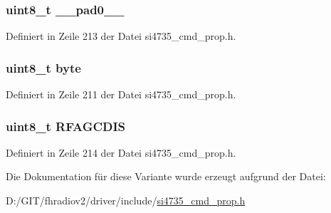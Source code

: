 \subsubsection[{\+\_\+\+\_\+pad0\+\_\+\+\_\+}]{\setlength{\rightskip}{0pt plus 5cm}uint8\+\_\+t \+\_\+\+\_\+pad0\+\_\+\+\_\+}\label{unionfm__agc__override__arg1_a8b4eebe79ded0459acec2f4950102ba3}


Definiert in Zeile 213 der Datei si4735\+\_\+cmd\+\_\+prop.\+h.

\hypertarget{unionfm__agc__override__arg1_a96f44d20f1dbf1c8785a7bc99a46164c}{}
\subsubsection[{byte}]{\setlength{\rightskip}{0pt plus 5cm}uint8\+\_\+t byte}\label{unionfm__agc__override__arg1_a96f44d20f1dbf1c8785a7bc99a46164c}


Definiert in Zeile 211 der Datei si4735\+\_\+cmd\+\_\+prop.\+h.

\hypertarget{unionfm__agc__override__arg1_a08f693cbe8c1321a038234eb53d365b9}{}
\subsubsection[{R\+F\+A\+G\+C\+D\+I\+S}]{\setlength{\rightskip}{0pt plus 5cm}uint8\+\_\+t R\+F\+A\+G\+C\+D\+I\+S}\label{unionfm__agc__override__arg1_a08f693cbe8c1321a038234eb53d365b9}


Definiert in Zeile 214 der Datei si4735\+\_\+cmd\+\_\+prop.\+h.



Die Dokumentation für diese Variante wurde erzeugt aufgrund der Datei\+:\begin{DoxyCompactItemize}
\item 
D\+:/\+G\+I\+T/fhradiov2/driver/include/\hyperlink{si4735__cmd__prop_8h}{si4735\+\_\+cmd\+\_\+prop.\+h}\end{DoxyCompactItemize}
